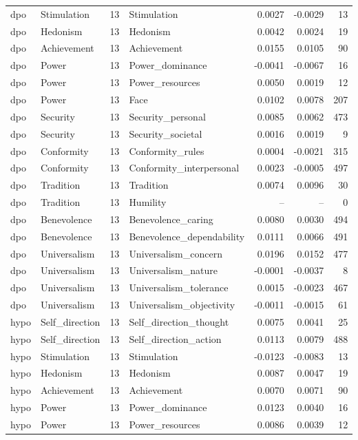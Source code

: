 \begin{tabular}{llrlrrr}
dpo & Stimulation & 13 & Stimulation & 0.0027 & -0.0029 & 13 \\
dpo & Hedonism & 13 & Hedonism & 0.0042 & 0.0024 & 19 \\
dpo & Achievement & 13 & Achievement & 0.0155 & 0.0105 & 90 \\
dpo & Power & 13 & Power\_dominance & -0.0041 & -0.0067 & 16 \\
dpo & Power & 13 & Power\_resources & 0.0050 & 0.0019 & 12 \\
dpo & Power & 13 & Face & 0.0102 & 0.0078 & 207 \\
dpo & Security & 13 & Security\_personal & 0.0085 & 0.0062 & 473 \\
dpo & Security & 13 & Security\_societal & 0.0016 & 0.0019 & 9 \\
dpo & Conformity & 13 & Conformity\_rules & 0.0004 & -0.0021 & 315 \\
dpo & Conformity & 13 & Conformity\_interpersonal & 0.0023 & -0.0005 & 497 \\
dpo & Tradition & 13 & Tradition & 0.0074 & 0.0096 & 30 \\
dpo & Tradition & 13 & Humility & -- & -- & 0 \\
dpo & Benevolence & 13 & Benevolence\_caring & 0.0080 & 0.0030 & 494 \\
dpo & Benevolence & 13 & Benevolence\_dependability & 0.0111 & 0.0066 & 491 \\
dpo & Universalism & 13 & Universalism\_concern & 0.0196 & 0.0152 & 477 \\
dpo & Universalism & 13 & Universalism\_nature & -0.0001 & -0.0037 & 8 \\
dpo & Universalism & 13 & Universalism\_tolerance & 0.0015 & -0.0023 & 467 \\
dpo & Universalism & 13 & Universalism\_objectivity & -0.0011 & -0.0015 & 61 \\
hypo & Self\_direction & 13 & Self\_direction\_thought & 0.0075 & 0.0041 & 25 \\
hypo & Self\_direction & 13 & Self\_direction\_action & 0.0113 & 0.0079 & 488 \\
hypo & Stimulation & 13 & Stimulation & -0.0123 & -0.0083 & 13 \\
hypo & Hedonism & 13 & Hedonism & 0.0087 & 0.0047 & 19 \\
hypo & Achievement & 13 & Achievement & 0.0070 & 0.0071 & 90 \\
hypo & Power & 13 & Power\_dominance & 0.0123 & 0.0040 & 16 \\
hypo & Power & 13 & Power\_resources & 0.0086 & 0.0039 & 12 \\

\end{tabular}
